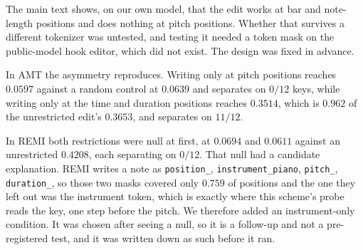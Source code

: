 \documentclass{article}
\begin{document}
%
The main text shows, on our own model, that the edit works at bar and note-length
positions and does nothing at pitch positions. Whether that survives a different
tokenizer was untested, and testing it needed a token mask on the public-model hook
editor, which did not exist. The design was fixed in advance.

In AMT the asymmetry reproduces. Writing only at pitch positions reaches $0.0597$
against a random control at $0.0639$ and separates on $0/12$ keys, while writing only at
the time and duration positions reaches $0.3514$, which is $0.962$ of the unrestricted
edit's $0.3653$, and separates on $11/12$.

In REMI both restrictions were null at first, at $0.0694$ and $0.0611$ against an
unrestricted $0.4208$, each separating on $0/12$. That null had a candidate explanation.
REMI writes a note as \texttt{position\_}, \texttt{instrument\_piano},
\texttt{pitch\_}, \texttt{duration\_}, so those two masks covered only $0.759$ of
positions and the one they left out was the instrument token, which is exactly where
this scheme's probe reads the key, one step before the pitch. We therefore added an
instrument-only condition. It was chosen after seeing a null, so it is a follow-up and
not a pre-registered test, and it was written down as such before it ran.
\end{document}
